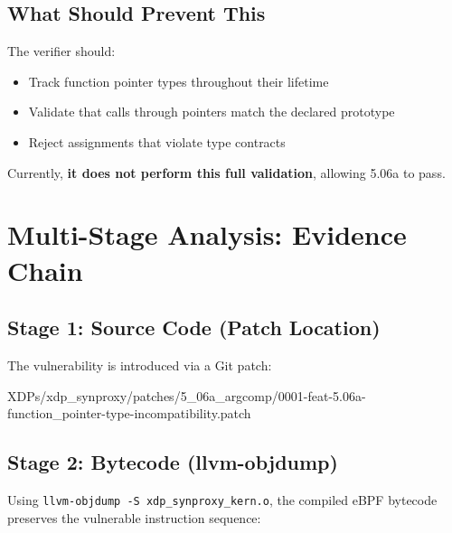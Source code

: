 \subsection{What Should Prevent This}

The verifier should:
\begin{itemize}
  \item Track function pointer types throughout their lifetime
  \item Validate that calls through pointers match the declared prototype
  \item Reject assignments that violate type contracts
\end{itemize}
\noindent
Currently, \textbf{it does not perform this full validation}, allowing 5.06a to pass.

\section{Multi-Stage Analysis: Evidence Chain}

\subsection{Stage 1: Source Code (Patch Location)}

The vulnerability is introduced via a Git patch: 

\begin{tcolorbox}[colback=gray!10, colframe=gray!10, arc=2pt, boxrule=0pt]
\small\ttfamily
XDPs/xdp\_synproxy/patches/5\_06a\_argcomp/0001-feat-5.06a-function\_pointer-type-incompatibility.patch
\end{tcolorbox}

\subsection{Stage 2: Bytecode (llvm-objdump)}

Using \texttt{llvm-objdump -S xdp\_synproxy\_kern.o}, the compiled eBPF bytecode preserves the vulnerable instruction sequence:

\vspace{0.3cm}
\noindent
{}
\vspace{0.3cm}

